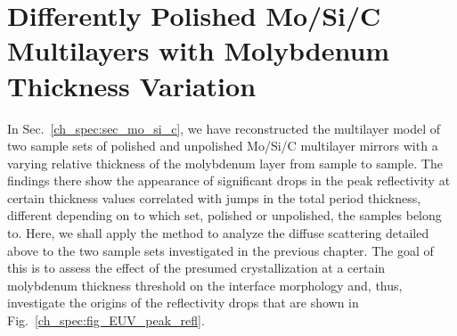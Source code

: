 \section{Differently Polished Mo/Si/C Multilayers with Molybdenum Thickness Variation} \label{ch_diff:sec_mo_si_c}
In Sec.~\ref{ch_spec:sec_mo_si_c}, we have reconstructed the multilayer model of two sample sets of polished and unpolished Mo/Si/C multilayer mirrors with a varying relative thickness of the molybdenum layer from sample to sample. The findings there show the appearance of significant drops in the peak reflectivity at certain thickness values correlated with jumps in the total period thickness, different depending on to which set, polished or unpolished, the samples belong to. Here, we shall apply the method to analyze the diffuse scattering detailed above to the two sample sets investigated in the previous chapter. The goal of this is to assess the effect of the presumed crystallization at a certain molybdenum thickness threshold on the interface morphology and, thus, investigate the origins of the reflectivity drops that are shown in Fig.~\ref{ch_spec:fig_EUV_peak_refl}.

